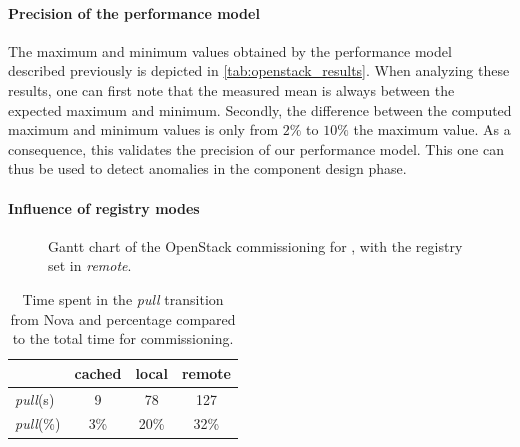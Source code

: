 \paragraph{Precision of the performance model}
The maximum and minimum values obtained by the performance model described
previously is depicted in \cref{tab:openstack_results}. When analyzing these
results, one can first note that the measured mean is always between the
expected maximum and minimum. Secondly, the difference between the computed
maximum and minimum values is only from $2\%$ to $10\%$ the maximum value. As a
consequence, this validates the precision of our performance model.
This one can thus be used to detect anomalies in the component design phase.

\paragraph{Influence of registry modes}

\begin{figure}[t]
  \begin{center}
    \def\svgwidth{\columnwidth}
    \scriptsize
      
      \label{fig:gantt_aeolus_remote}
      \caption{Gantt chart of the OpenStack commissioning for \aeoass, with the
      registry set in \emph{remote}.}
  \end{center}
\end{figure}

\begin{table}
  \begin{center}
    \begin{tabular}{lccc}
      \toprule
      & cached & local & remote\\
      \midrule
      \emph{pull}(s) & 9 & 78 & 127\\
      \emph{pull}(\%) & 3\% & 20\% & 32\%\\
      \bottomrule
    \end{tabular}
    \caption{Time spent in the \emph{pull} transition from Nova and
    percentage compared to the total time for \ansass commissioning.}
    \label{tab:pull}
  \end{center}
\end{table}


